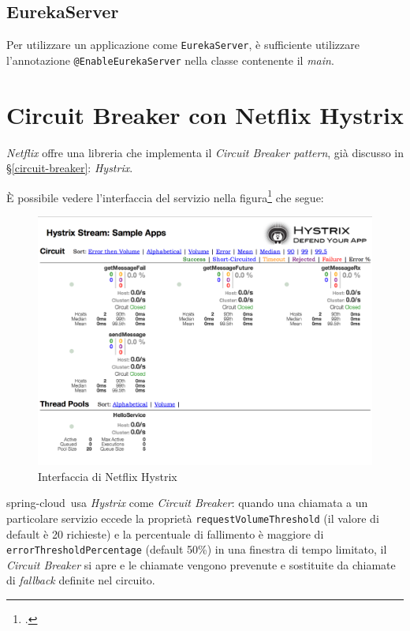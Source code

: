 \subsection{EurekaServer} Per utilizzare un applicazione come \texttt{EurekaServer}, è sufficiente utilizzare l'annotazione \texttt{@EnableEurekaServer} nella classe contenente il \textit{main}.


\section{Circuit Breaker con Netflix Hystrix}

\textit{Netflix} offre una libreria che implementa il \textit{Circuit Breaker pattern}, già discusso in \S\ref{circuit-breaker}: \textit{Hystrix}.

È possibile vedere l'interfaccia del servizio nella figura\footcite{site:fonte-netflix-hystrix} che segue:

\begin{figure}[H]
	\centering
	\includegraphics[width=\textwidth]{immagini/Hystrix.png}
	\caption[Interfaccia di Netflix Hystrix]{Interfaccia di Netflix Hystrix}
	\label{netflix-hystrix}
\end{figure}

\gls{spring-cloud}\gloss\ usa \textit{Hystrix} come \textit{Circuit Breaker}:
quando una chiamata a un particolare servizio eccede la proprietà \texttt{requestVolumeThreshold} (il valore di default è 20 richieste) e la percentuale di fallimento è maggiore di \texttt{errorThresholdPercentage} (default 50\%) in una finestra di tempo limitato,
il \textit{Circuit Breaker} si apre e le chiamate vengono prevenute e sostituite da chiamate di \textit{fallback} definite nel circuito.

